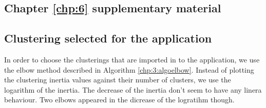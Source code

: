 \begin{appendices}






\chapter{Chapter \ref{chp:6} supplementary material} \label{app:chap6}

\section{Clustering selected for the application}\label{app:chap6:1}

In order to choose the clusterings that are imported in to the application, we use the elbow method described in Algorithm \ref{chp:3:algoelbow}. Instead of plotting the clustering inertia values against their number of clusters, we use the logarithm of the inertia. The decrease of the inertia don't seem to have any linera behaviour. Two elbows appeared in the dicrease of the logratihm though.  


\end{appendices}
